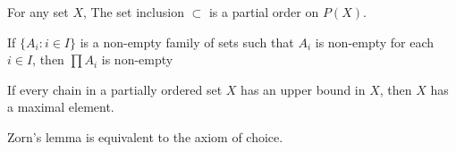 
	\begin{remark}
		For any set $X$, The set inclusion $\subset$ is a partial order on $P(X)$.
	\end{remark}
	\begin{axiom}[Choice]
		If $\{A_i : i \in I\}$ is a non-empty family of sets such that $A_i$ is non-empty for each $i \in I$, then $\prod A_i$ is non-empty
	\end{axiom}
	\begin{lemma}[Zorn]
		If every chain in a partially ordered set $X$ has an upper bound in $X$, then $X$ has a maximal element.
	\end{lemma}
	\begin{remark}
		Zorn's lemma is equivalent to the axiom of choice.\cite{alip1}
	\end{remark}


